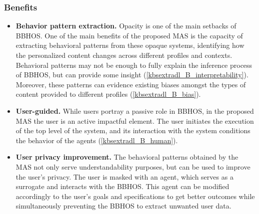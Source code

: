 \subsubsection*{Benefits}
\begin{itemize}
    \item \textbf{Behavior pattern extraction.} Opacity is one of the main setbacks of BBHOS. One of the main benefits of the proposed MAS is the capacity of extracting behavioral patterns from these opaque systems, identifying how the personalized content changes across different profiles and contexts. Behavioral patterns may not be enough to fully explain the inference process of BBHOS, but can provide some insight (\ref{kbsextradl_B_interpretability}). Moreover, these patterns can evidence existing biases amongst the types of content provided to different profiles (\ref{kbsextradl_B_bias}).
    
    \item \textbf{User-guided.} While users portray a passive role in BBHOS, in the proposed MAS the user is an active impactful element. The user initiates the execution of the top level of the system, and its interaction with the system conditions the behavior of the agents (\ref{kbsextradl_B_human}). 
    
    \item \textbf{User privacy improvement.} The behavioral patterns obtained by the MAS not only serve understandability purposes, but can be used to improve the user's privacy. The user is masked with an agent, which serves as a surrogate and interacts with the BBHOS. This agent can be modified accordingly to the user's goals and specifications to get better outcomes while simultaneously preventing the BBHOS to extract unwanted user data. 
\end{itemize}
